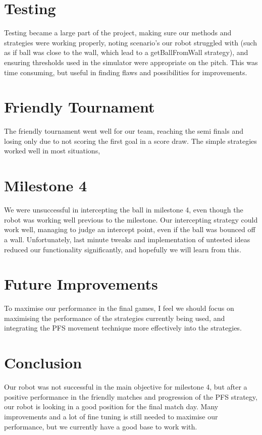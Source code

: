 \documentclass[12pt]{IEEEtran}
\begin{document}
\section{Testing}
Testing became a large part of the project, making sure our methods and strategies were working properly, noting scenario's our robot struggled with (such as if ball was close to the wall, which lead to a getBallFromWall strategy), and ensuring thresholds used in the simulator were appropriate on the pitch. This was time consuming, but useful in finding flaws and possibilities for improvements.

\section{Friendly Tournament}
The friendly tournament went well for our team, reaching the semi finals and losing only due to not scoring the first goal in a score draw. The simple strategies worked well in most situations, 

\section{Milestone 4}
We were unsuccessful in intercepting the ball in milestone 4, even though the robot was working well previous to the milestone. Our intercepting strategy could work well, managing to judge an intercept point, even if the ball was bounced off a wall. Unfortunately, last minute tweaks and implementation of untested ideas reduced our functionality significantly, and hopefully we will learn from this. 

\section{Future Improvements}
To maximise our performance in the final games, I feel we should focus on maximising the performance of the strategies currently being used, and integrating the PFS movement technique more effectively into the strategies. 

\section{Conclusion}
Our robot was not successful in the main objective for milestone 4, but after a positive performance in the friendly matches and progression of the PFS strategy, our robot is looking in a good position for the final match day. Many improvements and a lot of fine tuning is still needed to maximise our performance, but we currently have a good base to work with.
\end{document}
